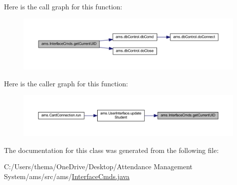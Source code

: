 Here is the call graph for this function\+:\nopagebreak
\begin{figure}[H]
\begin{center}
\leavevmode
\includegraphics[width=350pt]{classams_1_1_interface_cmds_a130756a981203cad81e5d92a8bfaf1f0_cgraph}
\end{center}
\end{figure}
Here is the caller graph for this function\+:\nopagebreak
\begin{figure}[H]
\begin{center}
\leavevmode
\includegraphics[width=350pt]{classams_1_1_interface_cmds_a130756a981203cad81e5d92a8bfaf1f0_icgraph}
\end{center}
\end{figure}


The documentation for this class was generated from the following file\+:\begin{DoxyCompactItemize}
\item 
C\+:/\+Users/thema/\+One\+Drive/\+Desktop/\+Attendance Management System/ams/src/ams/\mbox{\hyperlink{_interface_cmds_8java}{Interface\+Cmds.\+java}}\end{DoxyCompactItemize}
